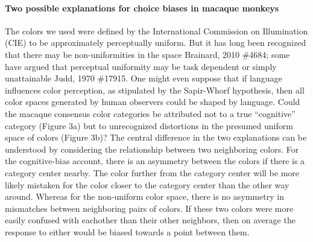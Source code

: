 \paragraph{Two possible explanations for choice biases in macaque monkeys}
The colors we used were defined by the International Commission on Illumination (CIE) to be approximately perceptually uniform. But it has long been recognized that there may be non-uniformities in the space {Brainard, 2010 \#4684}; some have argued that perceptual uniformity may be task dependent or simply unattainable {Judd, 1970 \#17915}. One might even suppose that if language influences color perception, as stipulated by the Sapir-Whorf hypothesis, then all color spaces generated by human observers could be shaped by language. Could the macaque consensus color categories be attributed not to a true “cognitive” category (Figure 3a) but to unrecognized distortions in the presumed uniform space of colors (Figure 3b)? The central difference in the two explanations can be understood by considering the relationship between two neighboring colors. For the cognitive-bias account, there is an asymmetry between the colors if there is a category center nearby. The color further from the category center will be more likely mistaken for the color closer to the category center than the other way around. Whereas for the non-uniform color space, there is no asymmetry in mismatches between neighboring pairs of colors. If these two colors were more easily confused with eachother than their other neighbors, then on average the response to either would be biased towards a point between them.

